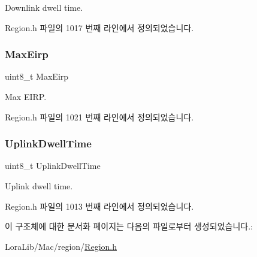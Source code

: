 Downlink dwell time. 

Region.\+h 파일의 1017 번째 라인에서 정의되었습니다.

\mbox{\label{structs_tx_param_setup_req_params_a6ac3be51bb6670f1617b54ec4781ca0f}} 
\subsubsection{\texorpdfstring{Max\+Eirp}{MaxEirp}}
{\footnotesize\ttfamily uint8\+\_\+t Max\+Eirp}

Max E\+I\+RP. 

Region.\+h 파일의 1021 번째 라인에서 정의되었습니다.

\mbox{\label{structs_tx_param_setup_req_params_a0e6663762d6f9173bc8d8cb018f8f17a}} 
\subsubsection{\texorpdfstring{Uplink\+Dwell\+Time}{UplinkDwellTime}}
{\footnotesize\ttfamily uint8\+\_\+t Uplink\+Dwell\+Time}

Uplink dwell time. 

Region.\+h 파일의 1013 번째 라인에서 정의되었습니다.



이 구조체에 대한 문서화 페이지는 다음의 파일로부터 생성되었습니다.\+:\begin{DoxyCompactItemize}
\item 
Lora\+Lib/\+Mac/region/\mbox{\hyperlink{_region_8h}{Region.\+h}}\end{DoxyCompactItemize}
